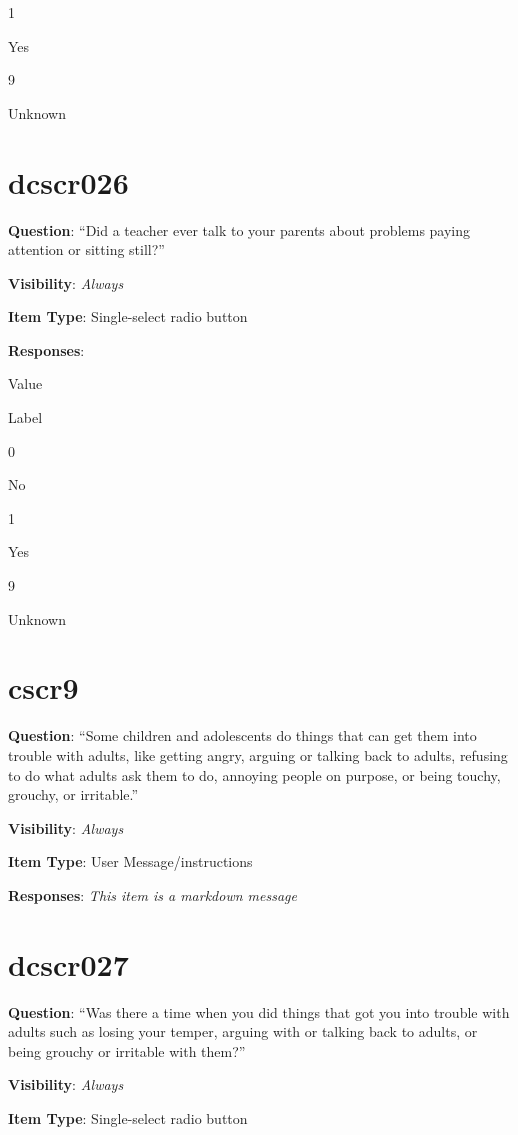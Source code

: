 \documentclass[]{book}
\begin{document}
1

Yes

9

Unknown

\hypertarget{dcscr026}{%
\section{dcscr026}\label{dcscr026}}

\textbf{Question}: ``Did a teacher ever talk to your parents about problems paying attention or sitting still?''

\textbf{Visibility}: \emph{Always}

\textbf{Item Type}: Single-select radio button

\textbf{Responses}:

Value

Label

0

No

1

Yes

9

Unknown

\hypertarget{cscr9}{%
\section{cscr9}\label{cscr9}}

\textbf{Question}: ``Some children and adolescents do things that can get them into trouble with adults, like getting angry, arguing or talking back to adults, refusing to do what adults ask them to do, annoying people on purpose, or being touchy, grouchy, or irritable.''

\textbf{Visibility}: \emph{Always}

\textbf{Item Type}: User Message/instructions

\textbf{Responses}: \emph{This item is a markdown message}

\hypertarget{dcscr027}{%
\section{dcscr027}\label{dcscr027}}

\textbf{Question}: ``Was there a time when you did things that got you into trouble with adults such as losing your temper, arguing with or talking back to adults, or being grouchy or irritable with them?''

\textbf{Visibility}: \emph{Always}

\textbf{Item Type}: Single-select radio button
\end{document}
